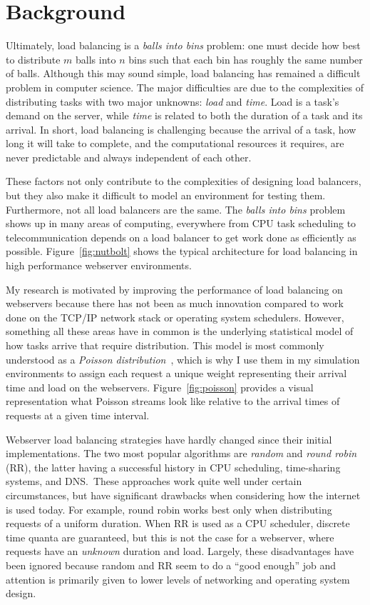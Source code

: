 \section{Background}
Ultimately, load balancing is a \emph{balls into bins} problem: one
must decide how best to distribute $m$ balls into $n$ bins such that
each bin has roughly the same number of balls. Although this may sound
simple, load balancing has remained a difficult problem in computer
science. The major difficulties are due to the complexities of
distributing tasks with two major unknowns: \emph{load} and
\emph{time}. Load is a task's demand on the server, while \emph{time}
is related to both the duration of a task and its arrival. In short,
load balancing is challenging because the arrival of a task, how long
it will take to complete, and the computational resources it requires,
are never predictable and always independent of each other.

These factors not only contribute to the complexities of designing
load balancers, but they also make it difficult to model an
environment for testing them. Furthermore, not all load balancers are
the same. The \emph{balls into bins} problem shows up in many areas of
computing, everywhere from CPU task scheduling to telecommunication
depends on a load balancer to get work done as efficiently as
possible. Figure~\ref{fig:nutbolt} shows the typical architecture for
load balancing in high performance webserver environments.

My research is motivated by improving the performance of load
balancing on webservers because there has not been as much innovation
compared to work done on the TCP/IP network stack or operating system
schedulers. However, something all these areas have in common is the
underlying statistical model of how tasks arrive that require
distribution. This model is most commonly understood as a
\textit{Poisson distribution}~\cite{adler}, which is why I use them in
my simulation environments to assign each request a unique weight
representing their arrival time and load on the webservers.
Figure~\ref{fig:poisson} provides a visual representation what Poisson
streams look like relative to the arrival times of requests at a given
time interval.

Webserver load balancing strategies have hardly changed since their
initial implementations. The two most popular algorithms are
\emph{random} and \emph{round robin} (RR), the latter having a
successful history in CPU scheduling, time-sharing systems, and DNS.\
These approaches work quite well under certain circumstances, but have
significant drawbacks when considering how the internet is used today.
For example, round robin works best only when distributing requests of
a uniform duration. When RR is used as a CPU scheduler, discrete time
quanta are guaranteed, but this is not the case for a webserver, where
requests have an \emph{unknown} duration and load. Largely, these
disadvantages have been ignored because random and RR seem to do a
``good enough'' job and attention is primarily given to lower levels
of networking and operating system design.

